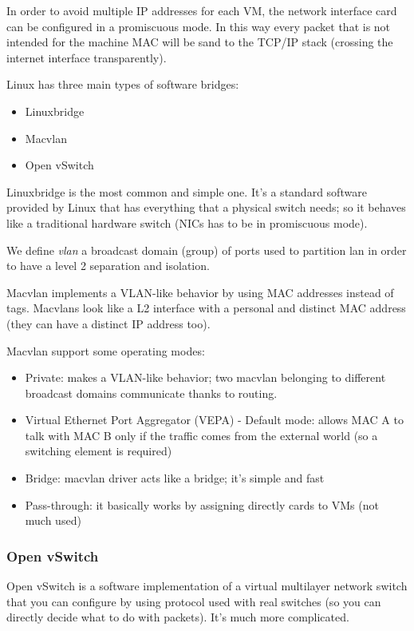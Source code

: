        In order to avoid multiple IP addresses for each VM, the network interface card can be configured in a promiscuous mode. In this way every packet that is not intended for the machine MAC will be sand to the TCP/IP stack (crossing the internet interface transparently).
        
        Linux has three main types of software bridges:
        \begin{itemize}
            \item Linuxbridge
            \item Macvlan
            \item Open vSwitch
        \end{itemize}
    
        Linuxbridge is the most common and simple one. It's a standard software provided by Linux that has everything that a physical switch needs; so it behaves like a traditional hardware switch (NICs has to be in promiscuous mode).
    
    
        We define \textit{vlan} a broadcast domain (group) of ports used to partition lan in order to have a level 2 separation and isolation.
        
        Macvlan implements a VLAN-like behavior by using MAC addresses instead of tags. Macvlans look like a L2 interface with a personal and distinct MAC address (they can have a distinct IP address too).
        
        Macvlan support some operating modes:
        \begin{itemize}
            \item Private: makes a VLAN-like behavior; two macvlan belonging to different broadcast domains communicate thanks to routing.
            \item Virtual Ethernet Port Aggregator (VEPA) - Default mode: allows MAC A to talk with MAC B only if the traffic comes from the external world (so a switching element is required)
            \item Bridge: macvlan driver acts like a bridge; it's simple and fast
            \item Pass-through: it basically works by assigning directly cards to VMs (not much used)
        \end{itemize}
  
        
        \subsubsection{Open vSwitch}
        Open vSwitch is a software implementation of a virtual multilayer network switch that you can configure by using protocol used with real switches (so you can directly decide what to do with packets). It's much more complicated.
    
